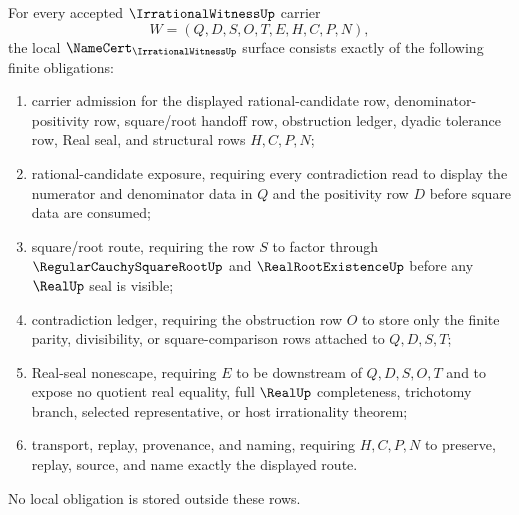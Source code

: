\begin{theorem}
\label{thm:irrational-witness-namecert-obligations}
For every accepted $\IrrationalWitnessUp$ carrier
$$
W=(Q,D,S,O,T,E,H,C,P,N),
$$
the local $\NameCert_{\IrrationalWitnessUp}$ surface consists exactly of the following finite obligations:
\begin{enumerate}
\item carrier admission for the displayed rational-candidate row, denominator-positivity row, square/root handoff row, obstruction ledger, dyadic tolerance row, Real seal, and structural rows $H,C,P,N$;
\item rational-candidate exposure, requiring every contradiction read to display the numerator and denominator data in $Q$ and the positivity row $D$ before square data are consumed;
\item square/root route, requiring the row $S$ to factor through $\RegularCauchySquareRootUp$ and $\RealRootExistenceUp$ before any $\RealUp$ seal is visible;
\item contradiction ledger, requiring the obstruction row $O$ to store only the finite parity, divisibility, or square-comparison rows attached to $Q,D,S,T$;
\item Real-seal nonescape, requiring $E$ to be downstream of $Q,D,S,O,T$ and to expose no quotient real equality, full $\RealUp$ completeness, trichotomy branch, selected representative, or host irrationality theorem;
\item transport, replay, provenance, and naming, requiring $H,C,P,N$ to preserve, replay, source, and name exactly the displayed route.
\end{enumerate}
No local obligation is stored outside these rows.
\end{theorem}
